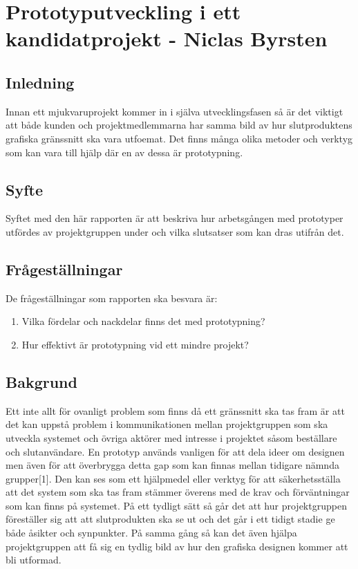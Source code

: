 \chapter{Prototyputveckling i ett kandidatprojekt - Niclas Byrsten}

\section{Inledning}
Innan ett mjukvaruprojekt kommer in i själva utvecklingsfasen så är det viktigt att både kunden och projektmedlemmarna har samma bild av hur slutproduktens grafiska gränssnitt ska vara utfoemat. Det finns många olika metoder och verktyg som kan vara till hjälp där en av dessa är prototypning.  

\section{Syfte}
Syftet med den här rapporten är att beskriva hur arbetsgången med prototyper utfördes av projektgruppen under och vilka slutsatser som kan dras utifrån det.  

\section{Frågeställningar}
De frågeställningar som rapporten ska besvara är:
\begin{enumerate}
    \item Vilka fördelar och nackdelar finns det med prototypning?
    \item Hur effektivt är prototypning vid ett mindre projekt?
\end{enumerate}

\section{Bakgrund}
Ett inte allt för ovanligt problem som finns då ett gränssnitt ska tas fram är att det kan uppstå problem i kommunikationen mellan projektgruppen som ska utveckla systemet och övriga aktörer med intresse i projektet såsom beställare och slutanvändare. En prototyp används vanligen för att dela ideer om designen men även för att överbrygga detta gap som kan finnas mellan tidigare nämnda grupper[1]. Den kan ses som ett hjälpmedel eller verktyg för att säkerhetsställa att det system som ska tas fram stämmer överens med de krav och förväntningar som kan finns på systemet. På ett tydligt sätt så går det att hur projektgruppen föreställer sig att att slutprodukten ska se ut och det går i ett tidigt stadie ge både åsikter och synpunkter. På samma gång så kan det även hjälpa projektgruppen att få sig en tydlig bild av hur den grafiska designen kommer att bli utformad. 

